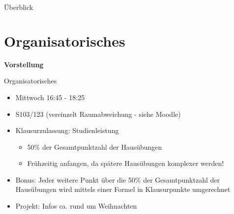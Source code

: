 \documentclass{../tuda-beamer}
\date{27. Oktober 2021}
\begin{document}
    \maketitle

    \begin{frame}{Überblick}
        \tableofcontents
    \end{frame}


    \section{Organisatorisches}
    \begin{frame}[c]
        \begin{center}
            \textbf{\LARGE Vorstellung}
        \end{center}
    \end{frame}

    \begin{frame}{Organisatorisches}
        \begin{itemize}
            \item Mittwoch 16:45 - 18:25
            \item S103/123 (vereinzelt Raumabweichung - siehe Moodle)
            \item Klausurzulassung: Studienleistung
            \begin{itemize}
                \item 50\% der Gesamtpunktzahl der Hausübungen
                \item Frühzeitig anfangen, da spätere Hausübungen komplexer werden!
            \end{itemize}
            \item Bonus: Jeder weitere Punkt über die 50\% der Gesamtpunktzahl der Hausübungen wird
            mittels einer Formel in Klausurpunkte umgerechnet
            \item Projekt: Infos ca. rund um Weihnachten
        \end{itemize}
    \end{frame}
\end{document}
